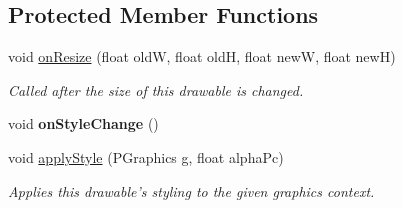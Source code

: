 \subsection*{Protected Member Functions}
\begin{DoxyCompactItemize}
\item 
void \hyperlink{classhype_1_1core_1_1drawable_1_1_h_drawable_ad83f255e2de9bb08f52c160c5bdcc1d7}{on\-Resize} (float old\-W, float old\-H, float new\-W, float new\-H)
\begin{DoxyCompactList}\small\item\em Called after the size of this drawable is changed. \end{DoxyCompactList}\item 
\hypertarget{classhype_1_1core_1_1drawable_1_1_h_drawable_af042f76a7f5b5fb39aa208478b95a9da}{void {\bfseries on\-Style\-Change} ()}\label{classhype_1_1core_1_1drawable_1_1_h_drawable_af042f76a7f5b5fb39aa208478b95a9da}

\item 
void \hyperlink{classhype_1_1core_1_1drawable_1_1_h_drawable_a0d27d893f24f8d96e4fb13ccc0024137}{apply\-Style} (P\-Graphics g, float alpha\-Pc)
\begin{DoxyCompactList}\small\item\em Applies this drawable's styling to the given graphics context. \end{DoxyCompactList}\end{DoxyCompactItemize}
